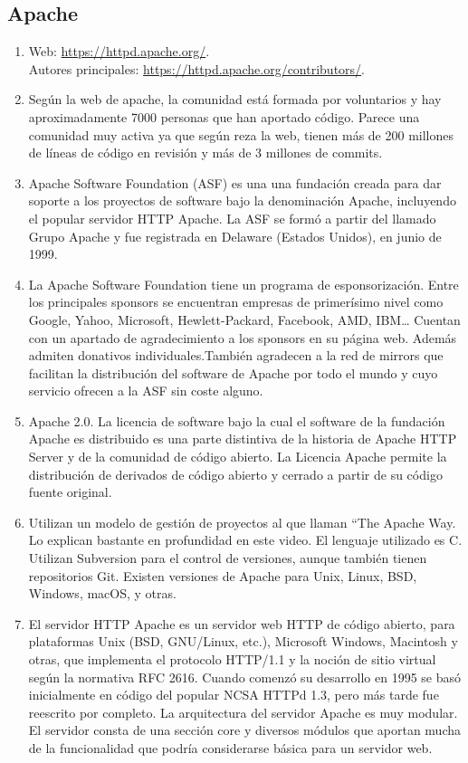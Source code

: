 \subsection{Apache}
\begin{enumerate}
    \item Web: \url{https://httpd.apache.org/}. \\ Autores principales: \url{https://httpd.apache.org/contributors/}.
    \item Según la web de apache, la comunidad está formada por voluntarios y hay aproximadamente 7000 personas que han aportado código. Parece una comunidad muy activa ya que según reza la web, tienen más de 200 millones de líneas de código en revisión y más de 3 millones de commits.
    \item Apache Software Foundation (ASF) es una una fundación creada para dar soporte a los proyectos de software bajo la denominación Apache, incluyendo el popular servidor HTTP Apache. La ASF se formó a partir del llamado Grupo Apache y fue registrada en Delaware (Estados Unidos), en junio de 1999. 
    \item La Apache Software Foundation tiene un programa de esponsorización. Entre los principales sponsors se encuentran empresas de primerísimo nivel como Google, Yahoo, Microsoft, Hewlett-Packard, Facebook, AMD, IBM… Cuentan con un apartado de agradecimiento a los sponsors en su página web. Además admiten donativos individuales.También agradecen a la red de mirrors que facilitan la distribución del software de Apache por todo el mundo y cuyo servicio ofrecen a la ASF sin coste alguno.
    \item Apache 2.0. La licencia de software bajo la cual el software de la fundación Apache es distribuido es una parte distintiva de la historia de Apache HTTP Server y de la comunidad de código abierto. La Licencia Apache permite la distribución de derivados de código abierto y cerrado a partir de su código fuente original. 
    \item Utilizan un modelo de gestión de proyectos al que llaman “The Apache Way. Lo explican bastante en profundidad en este video. El lenguaje utilizado es C. Utilizan Subversion para el control de versiones, aunque también tienen repositorios Git. Existen versiones de Apache para Unix, Linux, BSD, Windows, macOS, y otras. 
    \item El servidor HTTP Apache es un servidor web HTTP de código abierto, para plataformas Unix (BSD, GNU/Linux, etc.), Microsoft Windows, Macintosh y otras, que implementa el protocolo HTTP/1.1 y la noción de sitio virtual según la normativa RFC 2616. Cuando comenzó su desarrollo en 1995 se basó inicialmente en código del popular NCSA HTTPd 1.3, pero más tarde fue reescrito por completo. La arquitectura del servidor Apache es muy modular. El servidor consta de una sección core y diversos módulos que aportan mucha de la funcionalidad que podría considerarse básica para un servidor web.
\end{enumerate}
